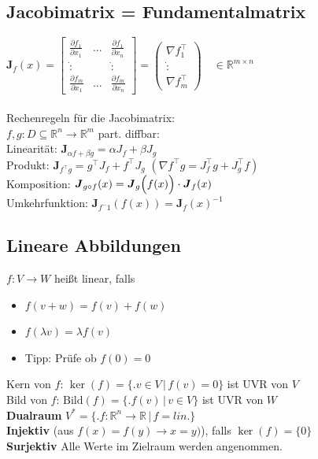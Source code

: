\documentclass[6pt,a4paper]{scrartcl}
\let\olddot = \dot
\newcommand{\iset}[2]{\ensuremath{\bigl\{ \bigl. #1 \, \bigr| \, #2 \bigr\}}}					%
\newcommand{\eset}[1]{\ensuremath{\bigl\{#1\bigr\}}}											%
\newcommand{\ma}[1]{\ensuremath{\boldsymbol {#1}}}												%
\newcommand{\svdots}{\ensuremath{\olddot :}}													%
\renewcommand{\emph}[1]{\textbf{#1}}															%
\renewcommand*{\dot}[1]{\accentset{\mbox{\textrm{\large\bfseries .}} }{#1}}						%
\newcommand{\ra}[0]{\ensuremath{\rightarrow}} 									%
\begin{document}
\begin{multicols*}{4}
\subsection{Jacobimatrix = Fundamentalmatrix}
$\ma J_f (x) = \begin{bmatrix} \frac{\partial f_1}{\partial x_1} & ... & \frac{\partial f_1}{\partial x_n} \\ \svdots & & \svdots \\ \frac{\partial f_m}{\partial x_1} & ... & \frac{\partial f_m}{\partial x_n} \end{bmatrix} = \begin{pmatrix} \nabla f_1^\top \\ \svdots \\ \nabla f_m^\top \end{pmatrix}  \quad \in \mathbb R^{m \times n}$\\ \\
Rechenregeln für die Jacobimatrix:\\
$f,g: D \subseteq \mathbb R^n \rightarrow \mathbb R^m$ part. diffbar:\\
Linearität: $\ma J_{\alpha f + \beta g} = \alpha J_f + \beta J_g$\\
Produkt: $\ma J_{f^\top g} = g^\top J_f + f^\top J_g$ \quad $(\nabla f^\top g = J_f^\top g + J_g^\top f)$\\
Komposition: $\ma J_{g \circ f}(x) = \ma J_g\Bigl(f(x)\Bigr) \cdot \ma J_f(x)$\\
Umkehrfunktion: $\ma J_{f^-1} (f(x)) = \ma J_f (x)^{-1}$


\subsection{Lineare Abbildungen}
$f:V \rightarrow W$ heißt linear, falls

\begin{itemize}\itemsep0pt
	\item $f(v+w) = f(v) + f(w)$
	\item $f(\lambda v) = \lambda f(v)$
	\item Tipp: Prüfe ob $f(0) = 0$
\end{itemize}
Kern von $f$: $\ker (f) = \iset{v \in V}{f(v) = 0}$ ist UVR von $V$\\
Bild von $f$: $\mathrm{Bild}(f) = \iset{f(v)}{v \in V}$ ist UVR von $W$\\
\emph{Dualraum} $V^* = \iset{f:\mathbb R^n \rightarrow \mathbb R}{f=lin.}$\\
\emph{Injektiv} (aus $f(x) = f(y) \ra x = y)$), falls $\ker(f) = \eset{0}$ \\
\emph{Surjektiv} Alle Werte im Zielraum werden angenommen.








\end{multicols*}
\end{document}
